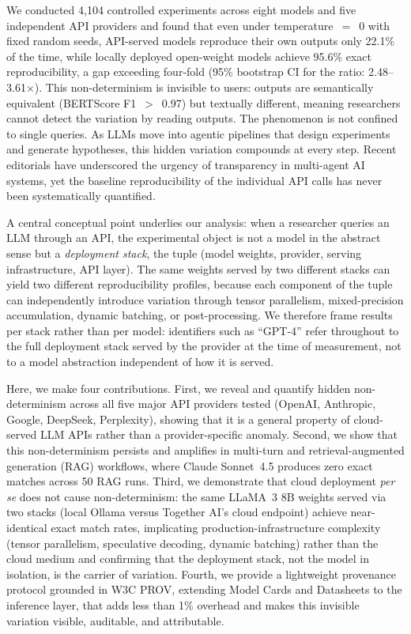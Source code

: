 \documentclass[sn-nature]{sn-jnl}
\begin{document}
We conducted 4,104 controlled experiments across eight models and five independent API providers and found that even under temperature~$=$~0 with fixed random seeds, API-served models reproduce their own outputs only 22.1\% of the time, while locally deployed open-weight models achieve 95.6\% exact reproducibility, a gap exceeding four-fold (95\% bootstrap CI for the ratio: 2.48--3.61$\times$).
This non-determinism is invisible to users: outputs are semantically equivalent (BERTScore F1~$>$~0.97) but textually different, meaning researchers cannot detect the variation by reading outputs.
The phenomenon is not confined to single queries.
As LLMs move into agentic pipelines that design experiments and generate hypotheses\cite{xin2025agentic}, this hidden variation compounds at every step.
Recent editorials have underscored the urgency of transparency in multi-agent AI systems\cite{editorial2026multiagent}, yet the baseline reproducibility of the individual API calls has never been systematically quantified.

A central conceptual point underlies our analysis: when a researcher queries an LLM through an API, the experimental object is not a model in the abstract sense but a \emph{deployment stack}, the tuple (model weights, provider, serving infrastructure, API layer).
The same weights served by two different stacks can yield two different reproducibility profiles, because each component of the tuple can independently introduce variation through tensor parallelism, mixed-precision accumulation, dynamic batching, or post-processing.
We therefore frame results per stack rather than per model: identifiers such as ``GPT-4'' refer throughout to the full deployment stack served by the provider at the time of measurement, not to a model abstraction independent of how it is served.

Here, we make four contributions.
First, we reveal and quantify hidden non-determinism across all five major API providers tested (OpenAI, Anthropic, Google, DeepSeek, Perplexity), showing that it is a general property of cloud-served LLM APIs rather than a provider-specific anomaly.
Second, we show that this non-determinism persists and amplifies in multi-turn and retrieval-augmented generation (RAG) workflows, where Claude Sonnet~4.5 produces zero exact matches across 50 RAG runs.
Third, we demonstrate that cloud deployment \emph{per se} does not cause non-determinism: the same LLaMA~3 8B weights served via two stacks (local Ollama versus Together AI's cloud endpoint) achieve near-identical exact match rates, implicating production-infrastructure complexity (tensor parallelism, speculative decoding, dynamic batching) rather than the cloud medium and confirming that the deployment stack, not the model in isolation, is the carrier of variation.
Fourth, we provide a lightweight provenance protocol grounded in W3C PROV\cite{w3cprov2013}, extending Model Cards\cite{mitchell2019model} and Datasheets\cite{gebru2021datasheets} to the inference layer, that adds less than 1\% overhead and makes this invisible variation visible, auditable, and attributable.
\end{document}
